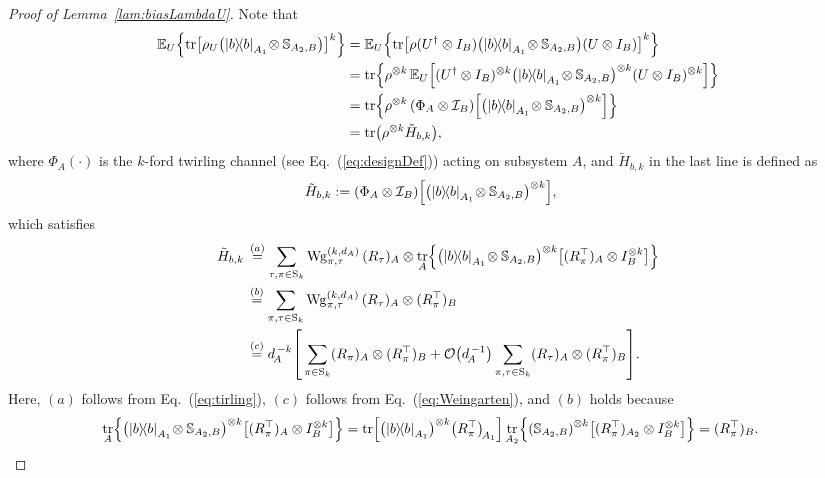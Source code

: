 \documentclass[aps,prl,twocolumn,nofootinbib,superscriptaddress,10pt]{revtex4-2}
\let\originalleft\left
\let\originalright\right
\renewcommand{\left}{\mathopen{}\mathclose\bgroup\originalleft}
\renewcommand{\right}{\aftergroup\egroup\originalright}
\def\E{ {\mathbb E} } %
\newcommand{\ketbra}[2]{\ensuremath{\left|#1\right\rangle\!\left\langle#2\right|}}
\DeclareMathOperator{\Tr}{tr}
\newcommand{\bigo}[1]{\mathcal{O}\left(#1\right)}
\theoremstyle{plain}
\theoremstyle{definition}
\newcommand{\Wg}{\mathrm{Wg}}
\newcommand{\eref}[1]{Eq.~\textup{(\ref{#1})}}
\newcommand{\lref}[1]{Lemma~\ref{#1}}
\begin{document}
\begin{proof}[Proof of \lref{lam:biasLambdaU}]
Note that 
\begin{align}\label{eq:ELambdaU2}
\E_{U} \left\lbrace  \Tr\left[\rho_{U} \left( \ketbra{b}{b}_{A_1} \!\otimes \mathbb{S}_{A_2,B} \right)  \right]^k \right\rbrace
&= 
\E_{U} \left\lbrace \Tr\left[\rho(U^{\dag}\otimes I_B) \left(\ketbra{b}{b}_{A_1} \!\otimes \mathbb{S}_{A_2,B} \right) (U\otimes I_B) \right]^k \right\rbrace
\nonumber\\
&= 
\Tr\left\{\rho^{\otimes k} \, \E_{U} \left[ (U^{\dag}\otimes I_B)^{\otimes k} \left(\ketbra{b}{b}_{A_1} \!\otimes \mathbb{S}_{A_2,B} \right)^{\otimes k} (U\otimes I_B)^{\otimes k} \right]\right\}
\nonumber\\
&= 
\Tr\left\{\rho^{\otimes k} \, \left(\Phi_{A}\otimes \mathcal{I}_{B} \right) 
\left[ \left(\ketbra{b}{b}_{A_1} \!\otimes \mathbb{S}_{A_2,B} \right)^{\otimes k}\right]  \right\}
\nonumber\\
&= \Tr \left( \rho^{\otimes k}\tilde H_{b,k} \right) , 
\end{align}
where $\Phi_{A}(\cdot)$ is the $k$-ford twirling channel (see \eref{eq:designDef}) acting on subsystem $A$, and $\tilde H_{b,k}$ in the last line is defined as 
\begin{align}
\tilde H_{b,k}
&:=\left(\Phi_{A}\otimes \mathcal{I}_{B} \right) \left[ \left(\ketbra{b}{b}_{A_1} \!\otimes \mathbb{S}_{A_2,B} \right)^{\otimes k}\right], 
\end{align}
which satisfies
\begin{align}\label{eq:ELambdaU3}
\tilde H_{b,k}
&\,\stackrel{(a)}{=} \sum_{\tau,\pi\in \mathrm{S}_k} \Wg_{\pi,\tau}^{(k,d_A)} \, 
(R_{\tau})_A \otimes 
\Tr_A \left\lbrace \left(\ketbra{b}{b}_{A_1} \!\otimes \mathbb{S}_{A_2,B} \right)^{\otimes k} \left[  (R_{\pi}^{\top})_A \otimes I_B^{\otimes k} \right] \right\rbrace 
\nonumber \\
&\,\stackrel{(b)}{=} \sum_{\pi, \tau \in \mathrm{S}_k} \Wg_{\pi,\tau}^{(k,d_A)} \, 
(R_\tau)_{A} \otimes (R_\pi^\top)_B
\nonumber \\
&\,\stackrel{(c)}{=} d_{\!A}^{\,-k} \left[\, \sum_{\pi\in \mathrm{S}_k} (R_\pi)_A \otimes (R_\pi^\top)_B 
+ \bigo{d_{\!A}^{\,-1}} \sum_{\pi, \tau \in \mathrm{S}_k} 
(R_\tau)_{A} \otimes (R_\pi^\top)_B \right] .
\end{align}
Here, $(a)$ follows from \eref{eq:tirling}, $(c)$ follows from \eref{eq:Weingarten}, and $(b)$ holds because 
\begin{align}
\Tr_A \left\lbrace \left(\ketbra{b}{b}_{A_1} \!\otimes \mathbb{S}_{A_2,B} \right)^{\otimes k} \left[  (R_{\pi}^{\top})_A \otimes I_B^{\otimes k} \right] \right\rbrace 
&= \Tr \left[\left( \ketbra{b}{b}_{A_1}\right) ^{\otimes k}\left( R_{\pi}^{\top}\right)_{\!A_1}\right] 
\Tr_{A_2} \left\lbrace \left( \mathbb{S}_{A_2,B}\right) ^{\otimes k} \left[(R_{\pi}^{\top})_{A_2} \otimes I_B^{\otimes k} \right] \right\rbrace 
= (R_\pi^\top)_B .   
\end{align}


\end{proof}
\end{document}

